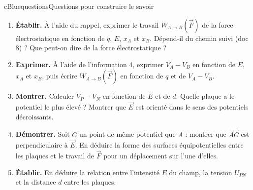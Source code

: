 \documentclass[11pt,a4paper]{article}
\newcommand{\vect}[1]{\overrightarrow{#1}}
\newcommand{\kw}[1]{{\sffamily\bfseries\color{cBlue}#1}}   %
\newcommand{\W}[2]{W_{#1\rightarrow #2}(\vect{F})}
\begin{document}
\begin{rub}{cBlue}{questions}{Questions pour construire le savoir}
\begin{enumerate}
  \item \kw{Établir.} À l’aide du rappel, exprimer le travail $\W{A}{B}$ de la force électrostatique en fonction de $q$, $E$, $x_A$ et $x_B$. Dépend-il du chemin suivi (doc 8) ? Que peut-on dire de la force électrostatique ?
  \item \kw{Exprimer.} À l’aide de l’information 4, exprimer $V_A - V_B$ en fonction de $E$, $x_A$ et $x_B$, puis écrire $\W{A}{B}$ en fonction de $q$ et de $V_A - V_B$.
  \item \kw{Montrer.} Calculer $V_P - V_N$ en fonction de $E$ et de $d$. Quelle plaque a le potentiel le plus élevé ? Montrer que $\vect{E}$ est orienté dans le sens des potentiels décroissants.
  \item \kw{Démontrer.} Soit $C$ un point de même potentiel que $A$ : montrer que $\vect{AC}$ est perpendiculaire à $\vect{E}$. En déduire la forme des surfaces équipotentielles entre les plaques et le travail de $\vect{F}$ pour un déplacement sur l’une d’elles.
  \item \kw{Établir.} En déduire la relation entre l’intensité $E$ du champ, la tension $U_{PN}$ et la distance $d$ entre les plaques.
\end{enumerate}
\end{rub}
\end{document}
